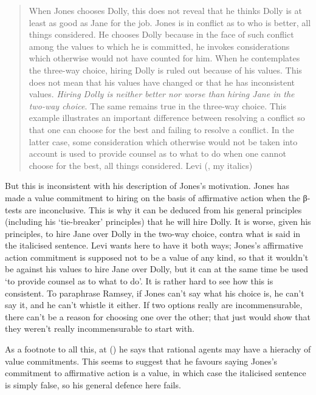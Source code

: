 \documentclass[
  10pt,
  letterpaper,
  DIV=11,
  numbers=noendperiod,
  twoside]{scrartcl}
\begin{document}
\begin{quote}
When Jones chooses Dolly, this does not reveal that he thinks Dolly is
at least as good as Jane for the job. Jones is in conflict as to who is
better, all things considered. He chooses Dolly because in the face of
such conflict among the values to which he is committed, he invokes
considerations which otherwise would not have counted for him. When he
contemplates the three-way choice, hiring Dolly is ruled out because of
his values. This does not mean that his values have changed or that he
has inconsistent values. \emph{Hiring Dolly is neither better nor worse
than hiring Jane in the two-way choice}. The same remains true in the
three-way choice. This example illustrates an important difference
between resolving a conflict so that one can choose for the best and
failing to resolve a conflict. In the latter case, some consideration
which otherwise would not be taken into account is used to provide
counsel as to what to do when one cannot choose for the best, all things
considered. Levi (, my italics)
\end{quote}

But this is inconsistent with his description of Jones's motivation.
Jones has made a value commitment to hiring on the basis of affirmative
action when the β-tests are inconclusive. This is why it can be deduced
from his general principles (including his `tie-breaker' principles)
that he will hire Dolly. It is worse, given his principles, to hire Jane
over Dolly in the two-way choice, contra what is said in the italicised
sentence. Levi wants here to have it both ways; Jones's affirmative
action commitment is supposed not to be a value of any kind, so that it
wouldn't be against his values to hire Jane over Dolly, but it can at
the same time be used `to provide counsel as to what to do'. It is
rather hard to see how this is consistent. To paraphrase Ramsey, if
Jones can't say what his choice is, he can't say it, and he can't
whistle it either. If two options really are incommensurable, there
can't be a reason for choosing one over the other; that just would show
that they weren't really incommensurable to start with.

As a footnote to all this, at () he
says that rational agents may have a hierachy of value commitments. This
seems to suggest that he favours saying Jones's commitment to
affirmative action is a value, in which case the italicised sentence is
simply false, so his general defence here fails.
\end{document}
